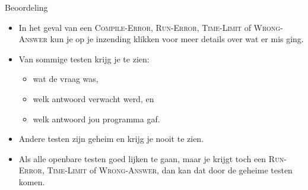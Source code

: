 \documentclass[serif,professionalfont]{beamer}
\begin{document}
\begin{frame}{Beoordeling}

    \begin{itemize}
    
        \item In het geval van een \textsc{Compile-Error}, \textsc{Run-Error}, \textsc{Time-Limit} of \textsc{Wrong-Answer} kun je op je inzending klikken voor meer details over wat er mis ging.
        
        \item Van sommige testen krijg je te zien:
        
            \begin{itemize}
            
                \item wat de vraag was,
                \item welk antwoord verwacht werd, en
                \item welk antwoord jou programma gaf.
             
            \end{itemize}
        
        \item Andere testen zijn geheim en krijg je nooit te zien.
        
        \item Als alle openbare testen goed lijken te gaan, maar je krijgt toch een \textsc{Run-Error}, \textsc{Time-Limit} of \textsc{Wrong-Answer}, dan kan dat door de geheime testen komen.
    
    \end{itemize}

\end{frame}
\end{document}
